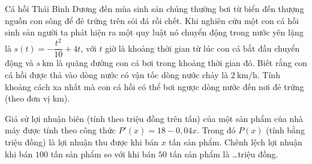 \begin{bt}%
	Cá hồi Thái Bình Dương đến mùa sinh sản chúng thường bơi từ biển đến thượng nguồn con sông để đẻ trứng trên sỏi đá rồi chết. Khi nghiên cứu một con cá hồi sinh sản người ta phát hiện ra một quy luật nó chuyển động trong nước yên lặng là $s(t)=-\dfrac{t^2}{10}+4t$, với $t$ giờ là khoảng thời gian từ lúc con cá bắt đầu chuyển động và $s \mathrm{~km}$ là quãng đường con cá bơi trong khoảng thời gian đó. Biết rằng con cá hồi được thả vào dòng nước có vận tốc dòng nước chảy là $2 \mathrm{~km}/\mathrm{h}$. Tính khoảng cách xa nhất mà con  cá hồi có thể bơi ngược dòng nước đến nơi đẻ trứng (theo đơn vị km).
\end{bt}

\begin{bt}%
	Giả sử lợi nhuận biên (tính theo triệu đồng trên tấn) của một sản phẩm của nhà máy được tính theo công thức $P'(x) = 18-0{,}04x$. Trong  đó $P(x)$ (tính bằng triệu đồng) là lợi nhuận thu được khi bán $x$ tấn sản phẩm. Chênh lệch lợi nhuận khi bán $100$ tấn sản phẩm so với khi bán $50$ tấn sản phẩm là \ldots triệu đồng.
\end{bt}

